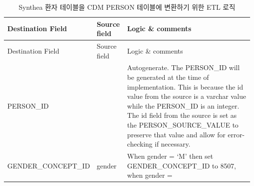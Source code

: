 \documentclass[10.5pt]{book}
\theoremstyle{definition}
\theoremstyle{definition}
\theoremstyle{definition}
\theoremstyle{remark}
\begin{document}
\begin{longtable}[]{@{}lll@{}}
\caption{\label{tab:syntheaEtlPerson} Synthea 환자 테이블을 CDM PERSON
테이블에 변환하기 위한 ETL 로직}\tabularnewline
\toprule
\begin{minipage}[b]{0.28\columnwidth}\raggedright\strut
Destination Field\strut
\end{minipage} & \begin{minipage}[b]{0.13\columnwidth}\raggedright\strut
Source field\strut
\end{minipage} & \begin{minipage}[b]{0.50\columnwidth}\raggedright\strut
Logic \& comments\strut
\end{minipage}\tabularnewline
\midrule
\endfirsthead
\toprule
\begin{minipage}[b]{0.28\columnwidth}\raggedright\strut
Destination Field\strut
\end{minipage} & \begin{minipage}[b]{0.13\columnwidth}\raggedright\strut
Source field\strut
\end{minipage} & \begin{minipage}[b]{0.50\columnwidth}\raggedright\strut
Logic \& comments\strut
\end{minipage}\tabularnewline
\midrule
\endhead
\begin{minipage}[t]{0.28\columnwidth}\raggedright\strut
PERSON\_ID\strut
\end{minipage} & \begin{minipage}[t]{0.13\columnwidth}\raggedright\strut
\strut
\end{minipage} & \begin{minipage}[t]{0.50\columnwidth}\raggedright\strut
Autogenerate. The PERSON\_ID will be generated at the time of
implementation. This is because the id value from the source is a
varchar value while the PERSON\_ID is an integer. The id field from the
source is set as the PERSON\_SOURCE\_VALUE to preserve that value and
allow for error-checking if necessary.\strut
\end{minipage}\tabularnewline
\begin{minipage}[t]{0.28\columnwidth}\raggedright\strut
GENDER\_CONCEPT\_ID\strut
\end{minipage} & \begin{minipage}[t]{0.13\columnwidth}\raggedright\strut
gender\strut
\end{minipage} & \begin{minipage}[t]{0.50\columnwidth}\raggedright\strut
When gender = `M' then set GENDER\_CONCEPT\_ID to 8507, when gender =

\end{minipage}
\end{longtable}
\end{document}
